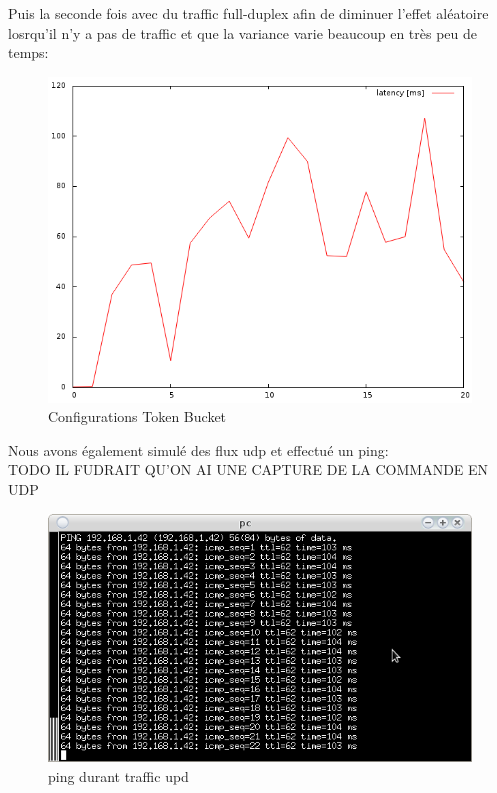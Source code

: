 \documentclass{article}
\begin{document}
Puis la seconde fois avec du traffic full-duplex afin de diminuer l'effet aléatoire losrqu'il n'y a pas de traffic et que la variance varie beaucoup en très peu de temps:
\begin{figure}[h]
  \centering
  \includegraphics[width=\linewidth]{./captures/6-plot-fullduplex.png}
  \caption{Configurations Token Bucket}
  \label{fig:token-bucket}
\end{figure}

Nous avons également simulé des flux udp et effectué un ping:\\
TODO IL FUDRAIT QU'ON AI UNE CAPTURE DE LA COMMANDE EN UDP

\begin{figure}[h]
  \centering
  \includegraphics[width=\linewidth]{./captures/10-udp.png}
  \caption{ping durant traffic upd}
  \label{fig:token-bucket}
\end{figure}
\end{document}

